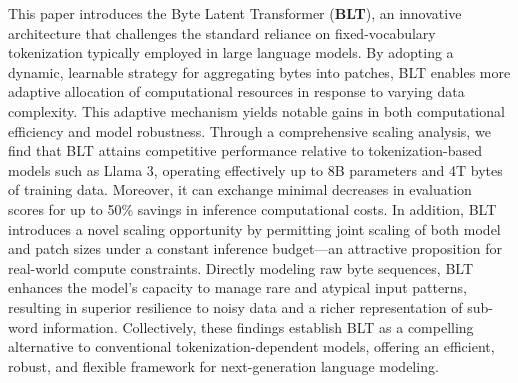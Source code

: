 This paper introduces the Byte Latent Transformer (\textbf{BLT}), an innovative architecture that challenges the standard reliance on fixed-vocabulary tokenization typically employed in large language models. By adopting a dynamic, learnable strategy for aggregating bytes into patches, {\textsc BLT} enables more adaptive allocation of computational resources in response to varying data complexity. This adaptive mechanism yields notable gains in both computational efficiency and model robustness. Through a comprehensive scaling analysis, we find that {\textsc BLT} attains competitive performance relative to tokenization-based models such as Llama 3, operating effectively up to 8B parameters and 4T bytes of training data. Moreover, it can exchange minimal decreases in evaluation scores for up to 50\% savings in inference computational costs. In addition, {\textsc BLT} introduces a novel scaling opportunity by permitting joint scaling of both model and patch sizes under a constant inference budget—an attractive proposition for real-world compute constraints. Directly modeling raw byte sequences, {\textsc BLT} enhances the model's capacity to manage rare and atypical input patterns, resulting in superior resilience to noisy data and a richer representation of sub-word information. Collectively, these findings establish {\textsc BLT} as a compelling alternative to conventional tokenization-dependent models, offering an efficient, robust, and flexible framework for next-generation language modeling.


